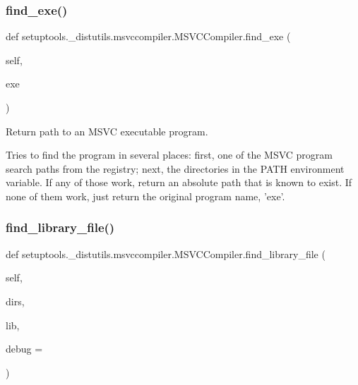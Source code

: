 \mbox{\label{classsetuptools_1_1__distutils_1_1msvccompiler_1_1MSVCCompiler_a62c9dbd77f182e31347c8a19ab3a14b8}} 
\subsubsection{\texorpdfstring{find\+\_\+exe()}{find\_exe()}}
{\footnotesize\ttfamily def setuptools.\+\_\+distutils.\+msvccompiler.\+M\+S\+V\+C\+Compiler.\+find\+\_\+exe (\begin{DoxyParamCaption}\item[{}]{self,  }\item[{}]{exe }\end{DoxyParamCaption})}

\begin{DoxyVerb}Return path to an MSVC executable program.

Tries to find the program in several places: first, one of the
MSVC program search paths from the registry; next, the directories
in the PATH environment variable.  If any of those work, return an
absolute path that is known to exist.  If none of them work, just
return the original program name, 'exe'.
\end{DoxyVerb}
 \mbox{\label{classsetuptools_1_1__distutils_1_1msvccompiler_1_1MSVCCompiler_aa1d7b6a9368997fb300419a97c6cbd30}} 
\subsubsection{\texorpdfstring{find\+\_\+library\+\_\+file()}{find\_library\_file()}}
{\footnotesize\ttfamily def setuptools.\+\_\+distutils.\+msvccompiler.\+M\+S\+V\+C\+Compiler.\+find\+\_\+library\+\_\+file (\begin{DoxyParamCaption}\item[{}]{self,  }\item[{}]{dirs,  }\item[{}]{lib,  }\item[{}]{debug = {} }\end{DoxyParamCaption})}

